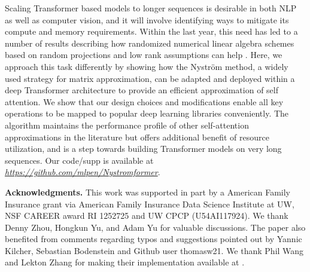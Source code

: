 Scaling Transformer based models to longer sequences is desirable in both NLP as well as computer vision, and it will involve identifying ways to mitigate its compute and memory requirements. Within the last year, this need has led to a number of results describing how randomized numerical linear algebra schemes based on random projections and low rank assumptions can help \cite{katharopoulos-et-al-2020,wang2020linformer,Beltagy2020Longformer,zaheer2020big}. Here, we approach this task differently by showing how the Nystr\"{o}m method, a widely used strategy for matrix approximation, can be adapted and deployed within a deep Transformer architecture to provide an efficient approximation of self attention. We show that our design choices and modifications enable all key operations to be mapped to popular deep learning libraries conveniently. The algorithm maintains the performance profile of other self-attention approximations in the literature but offers additional benefit of resource utilization, and is a step towards building Transformer models on very long sequences. Our code/supp is available at \textit{\url{https://github.com/mlpen/Nystromformer}}. 

\medskip

{\bf Acknowledgments.} This work was supported in part by a American Family Insurance grant via American Family Insurance Data Science Institute at UW, NSF CAREER award RI 1252725 and UW CPCP (U54AI117924). We thank Denny Zhou, Hongkun Yu, and Adam Yu for valuable discussions. The paper also benefited from comments regarding typos and suggestions pointed out by Yannic Kilcher, Sebastian Bodenstein and Github user thomasw21. We thank Phil Wang and Lekton Zhang for making their implementation available at .

\small


